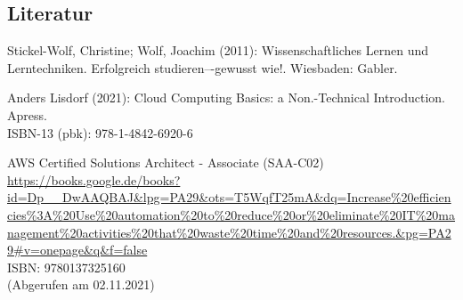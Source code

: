 

%
% 

\thispagestyle{empty}
\subsection{Literatur}
\renewcommand{\refname}{} %
\begin{thebibliography}{SW11} %
   Stickel-Wolf, Christine; Wolf, Joachim (2011): Wissenschaftliches Lernen und Lerntechniken. Erfolgreich studieren–-gewusst wie!. Wiesbaden: Gabler.
  
   Anders Lisdorf (2021): Cloud Computing Basics: a Non.-Technical Introduction. Apress. 
  \\ISBN-13 (pbk): 978-1-4842-6920-6
  
   AWS Certified Solutions Architect - Associate (SAA-C02)\\
  \url{https://books.google.de/books?id=Dp__DwAAQBAJ&lpg=PA29&ots=T5WqfT25mA&dq=Increase%20efficiencies%3A%20Use%20automation%20to%20reduce%20or%20eliminate%20IT%20management%20activities%20that%20waste%20time%20and%20resources.&pg=PA29#v=onepage&q&f=false}
  \\ISBN: 9780137325160
  \\(Abgerufen am 02.11.2021) 


\end{thebibliography}

